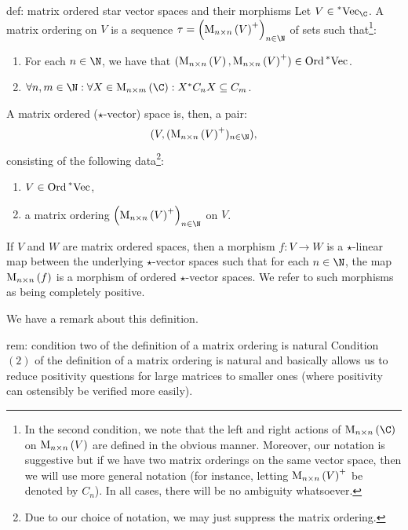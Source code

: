 \documentclass[main.tex]{subfiles}
\begin{document}
\begin{definition}{}{def: matrix ordered star vector spaces and their morphisms}
Let $V \in \StarVect$. A matrix ordering on $V$ is a sequence $\tau = \left(\Mat{n}{n}{V}^+\right)_{n \in \N}$ of sets such that\footnote{In the second condition, we note that the left and right actions of $\Mat{n}{n}{\C}$ on $\text{M}_{n \times n}\left(V\right)$ are defined in the obvious manner. Moreover, our notation is suggestive but if we have two matrix orderings on the same vector space, then we will use more general notation (for instance, letting $\text{M}_{n \times n}\left(V\right)^+$ be denoted by $C_n$). In all cases, there will be no ambiguity whatsoever.}: 
\begin{enumerate}
    \item For each $n \in \N$, we have that $(\text{M}_{n \times n}\left(V\right),\text{M}_{n \times n}\left(V\right)^+) \in \text{Ord}\prescript{*}{}{\text{Vec}}$. 
    \item $\forall n,m \in \N: \forall X \in \Mat{n}{m}{\C}: \dual{X}C_n X \subseteq C_m$. 
\end{enumerate}
A matrix ordered ($\star$-vector) space is, then, a pair: 
\[(V,(\Mat{n}{n}{V}^+)_{n \in \N}),\] 
consisting of the following data\footnote{Due to our choice of notation, we may just suppress the matrix ordering.}: 
\begin{enumerate}
    \item $V \in \text{Ord}\prescript{*}{}{\text{Vec}}$, 
    \item a matrix ordering $\left(\Mat{n}{n}{V}^+\right)_{n \in \N}$ on $V$.
\end{enumerate}  
If $V$ and $W$ are matrix ordered spaces, then a morphism $f: V \to W$ is a $\star$-linear map between the underlying $\star$-vector spaces such that for each $n \in \N$, the map $\text{M}_{n \times n}\left(f\right)$ is a morphism of ordered $\star$-vector spaces. We refer to such morphisms as being completely positive. 
\end{definition}

We have a remark about this definition.  

\begin{remark}{}{rem: condition two of the definition of a matrix ordering is natural}
Condition $(2)$ of the definition of a matrix ordering is natural and basically allows us to reduce positivity questions for large matrices to smaller ones (where positivity can ostensibly be verified more easily). 
\end{remark}
\end{document}
